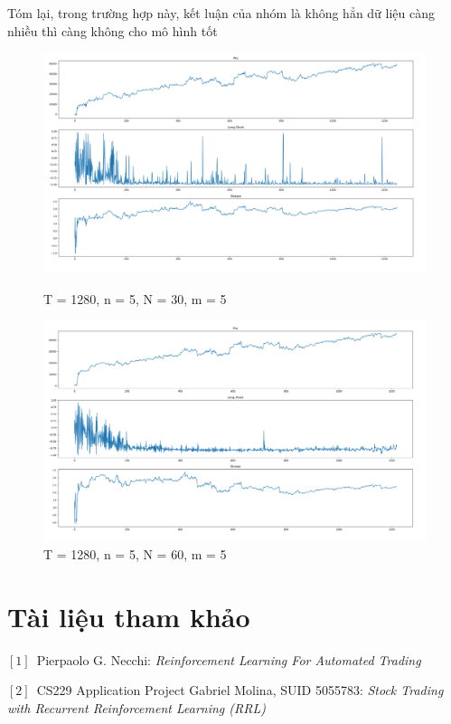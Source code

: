 \documentclass[14pt]{extreport}
\begin{document}
Tóm lại, trong trường hợp này, kết luận của nhóm là không hẳn dữ liệu càng nhiều thì càng không cho mô hình tốt
\begin{center}
    \begin{figure}[htp]
    \begin{center}
     \includegraphics[scale=.4]{result_1-1}
    \end{center}
    \caption{T = 1280, n = 5, N = 30, m = 5}
    \begin{center}
     \includegraphics[scale=.4]{result_2-1}
    \end{center}
    \caption{T = 1280, n = 5, N = 60, m = 5}
    \end{figure}
\end{center} 
\newpage

\chapter*{Tài liệu tham khảo}
\begin{flushleft}

\quad $[1]$\ Pierpaolo G. Necchi: \textit{ Reinforcement Learning For Automated Trading}

\quad $[2]$\ CS229 Application Project
Gabriel Molina, SUID 5055783: \textit{ Stock Trading with Recurrent Reinforcement
Learning (RRL)}
\end{flushleft}
\end{document}
